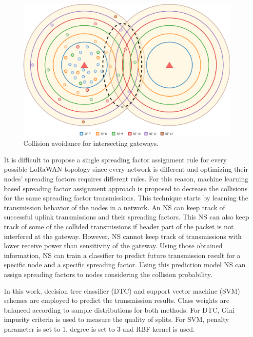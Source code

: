 \begin{figure}
\centering
\includegraphics[width=\linewidth]{fig/lora_multi_gw_collision_fix.png}
\vspace*{4mm}
\caption{Collision avoidance for intersecting gateways.}
\label{fig:collision_solution_multi_gw}
\end{figure}

It is difficult to propose a single spreading factor assignment rule for every possible LoRaWAN topology since every network is different and optimizing their nodes' spreading factors requires different rules. For this reason, machine learning based spreading factor assignment approach is proposed to decrease the collisions for the same spreading factor transmissions. This technique starts by learning the transmission behavior of the nodes in a network. An NS can keep track of successful uplink transmissions and their spreading factors. This NS can also keep track of some of the collided transmissions if header part of the packet is not interfered at the gateway. However, NS cannot keep track of transmissions with lower receive power than sensitivity of the gateway. Using those obtained information, NS can train a classifier to predict future transmission result for a specific node and a specific spreading factor. Using this prediction model NS can assign spreading factors to nodes considering the collision probability.

In this work, decision tree classifier (DTC) and support vector machine (SVM) \cite{Alpaydin} schemes are employed to predict the transmission results. Class weights are balanced according to sample distributions for both methods. For DTC, Gini impurity criteria is used to measure the quality of splits. For SVM, penalty parameter is set to 1, degree is set to 3 and RBF kernel is used.

